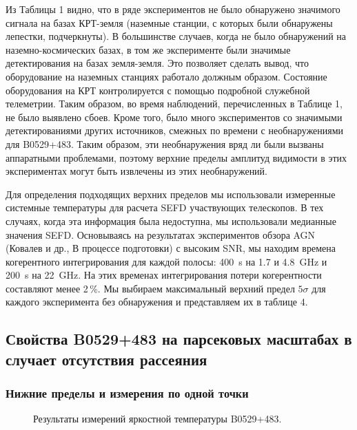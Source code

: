 Из Таблицы 1 видно, что в ряде экспериментов не было обнаружено значимого сигнала на базах
КРТ-земля (наземные станции, с которых были обнаружены лепестки, подчеркнуты). В большинстве
случаев, когда не было обнаружений на наземно-космических базах, в том же эксперименте были
значимые детектирования на базах земля-земля. Это позволяет сделать вывод, что
оборудование на наземных станциях работало должным образом. Состояние оборудования на КРТ
контролируется с помощью подробной служебной телеметрии. Таким образом, во время наблюдений,
перечисленных в Таблице 1, не было выявлено сбоев. Кроме того, было много экспериментов со
значимыми детектированиями других источников, смежных по времени с необнаружениями для B0529+483.
Таким образом, эти необнаружения вряд ли были вызваны аппаратными проблемами, поэтому верхние
пределы амплитуд видимости в этих экспериментах могут быть извлечены из этих необнаружений.

Для определения подходящих верхних пределов мы использовали измеренные системные температуры
для расчета SEFD участвующих телескопов. В тех случаях, когда эта информация была
недоступна, мы использовали медианные значения SEFD. Основываясь на результатах экспериментов
обзора AGN (Ковалев и др., В процессе подготовки) с высоким SNR, мы находим времена
когерентного интегрирования для каждой полосы: \SI{400}{\second} на 1.7 и \SI{4.8}{\GHz} и
\SI{200}{\second} на \SI{22}{\GHz}. На этих временах интегрирования потери когерентности составляют
менее 2\,\%. Мы выбираем максимальный верхний предел $5\sigma$ для каждого эксперимента без
обнаружения и представляем их в таблице 4.

\subsection{Свойства B0529+483 на парсековых масштабах в случает отсутствия рассеяния}

\subsubsection{Нижние пределы и измерения по одной точки}

\begin{figure}[]
\caption{Результаты измерений яркостной температуры B0529+483.}
\label{fig:0529_tb}
\end{figure}

